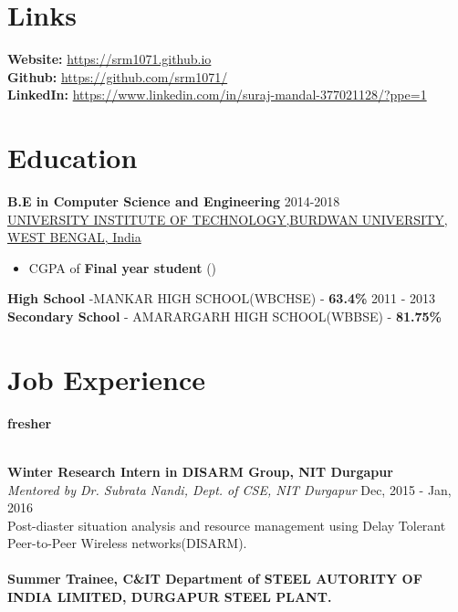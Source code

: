 \documentclass[margin, centered]{res}
\begin{document}
\begin{resume}
\section{Links}
\textbf{Website:} \url{https://srm1071.github.io} \\
\textbf{Github:} \url{https://github.com/srm1071/} \\
\textbf{LinkedIn:} \url{https://www.linkedin.com/in/suraj-mandal-377021128/?ppe=1} \\


\section{Education}

\textbf{B.E in Computer Science and Engineering} \hfill 2014-2018 \\
\href{http://http://uit.buruniv.ac.in//}{UNIVERSITY INSTITUTE OF TECHNOLOGY,BURDWAN UNIVERSITY, WEST BENGAL, India}
\begin{itemize}
 \item CGPA of \textbf{Final year student} ()
\end{itemize}
\textbf{High School} -MANKAR HIGH SCHOOL(WBCHSE) - \textbf{63.4\%} \hfill 2011 - 2013 \\
\textbf{Secondary School} - AMARARGARH HIGH SCHOOL(WBBSE) - \textbf{81.75\%} \hfill
 
\section{Job Experience}
\textbf{fresher}

\\
\textbf{Winter Research Intern in DISARM Group, NIT Durgapur} \\
\emph{Mentored by {Dr. Subrata Nandi, Dept. of CSE, NIT Durgapur}} \hfill Dec, 2015 - Jan, 2016 \\
Post-diaster situation analysis and resource management using Delay Tolerant Peer-to-Peer Wireless networks(DISARM).
\\
\\
\textbf{Summer Trainee, {C&IT Department of STEEL
AUTORITY OF INDIA LIMITED, DURGAPUR STEEL PLANT.} \\
\\
\\

}
\end{resume}
\end{document}
